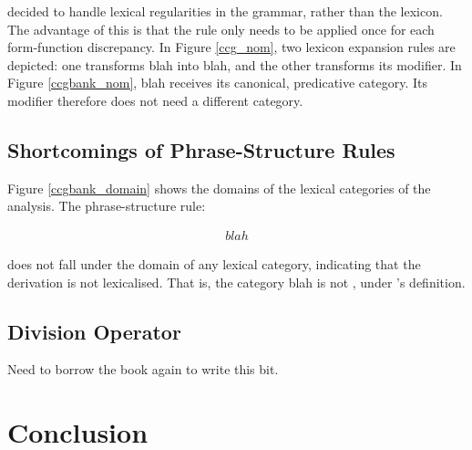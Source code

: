 \documentclass{article}
\newcommand{\cf}[1]{\mbox{$\it{#1}$}}   %
\begin{document}
{{\citet{ccgbank} decided to handle lexical regularities in the grammar, rather than the lexicon. The advantage of this is that the rule only needs to be applied once for each form-function discrepancy. In Figure \ref{ccg_nom}, two lexicon expansion rules are depicted: one transforms blah into blah, and the other transforms its modifier. In Figure \ref{ccgbank_nom}, blah receives its canonical, predicative category. Its modifier therefore does not need a different category.

\subsection{Shortcomings of Phrase-Structure Rules}

Figure \ref{ccgbank_domain} shows the domains of the lexical categories of the \ccgbank analysis. The phrase-structure rule:

\begin{eqnarray}
 blah
\end{eqnarray}

does not fall under the domain of any lexical category, indicating that the derivation is not lexicalised. That is, the category blah is not , under \citet{steedman96}'s definition.


\subsection{Division Operator}

Need to borrow the book again to write this bit.

\section{Conclusion}

}}
\end{document}
